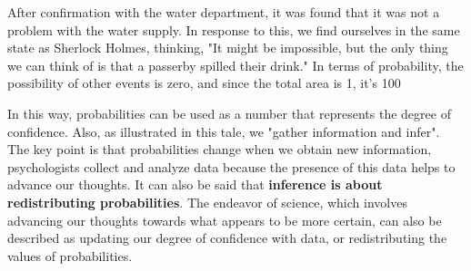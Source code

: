 After confirmation with the water department, it was found that it was not a problem with the water supply. In response to this, we find ourselves in the same state as Sherlock Holmes, thinking, "It might be impossible, but the only thing we can think of is that a passerby spilled their drink." In terms of probability, the possibility of other events is zero, and since the total area is 1, it's 100%


In this way, probabilities can be used as a number that represents the degree of confidence. Also, as illustrated in this tale, we "gather information and infer". The key point is that probabilities change when we obtain new information, psychologists collect and analyze data because the presence of this data helps to advance our thoughts. It can also be said that \textbf{inference is about redistributing probabilities}. The endeavor of science, which involves advancing our thoughts towards what appears to be more certain, can also be described as updating our degree of confidence with data, or redistributing the values of probabilities.


